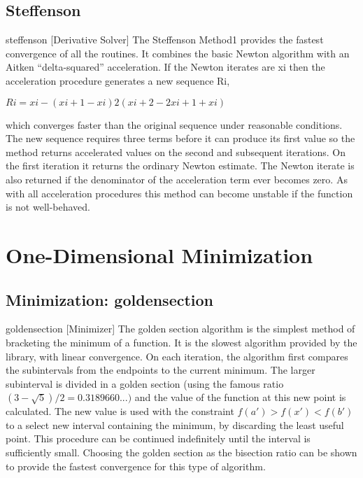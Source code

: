 \subsection{Steffenson}
steffenson [Derivative Solver]
The Steffenson Method1 provides the fastest convergence of all the routines. It combines
the basic Newton algorithm with an Aitken “delta-squared” acceleration. If the
Newton iterates are xi then the acceleration procedure generates a new sequence Ri,

$Ri = xi − (xi+1 − xi)2 (xi+2 − 2xi+1 + xi)$

which converges faster than the original sequence under reasonable conditions. The
new sequence requires three terms before it can produce its first value so the method
returns accelerated values on the second and subsequent iterations. On the first
iteration it returns the ordinary Newton estimate. The Newton iterate is also returned
if the denominator of the acceleration term ever becomes zero.
As with all acceleration procedures this method can become unstable if the function
is not well-behaved.



\section{One-Dimensional Minimization}



\subsection{Minimization: goldensection}
goldensection [Minimizer]
The golden section algorithm is the simplest method of bracketing the minimum of a
function. It is the slowest algorithm provided by the library, with linear convergence.
On each iteration, the algorithm first compares the subintervals from the endpoints to
the current minimum. The larger subinterval is divided in a golden section (using the
famous ratio $(3 − \sqrt{5})/2 = 0.3189660. . . )$ and the value of the function at this new
point is calculated. The new value is used with the constraint $f(a′) > f(x′) < f(b′)$
to a select new interval containing the minimum, by discarding the least useful point.
This procedure can be continued indefinitely until the interval is sufficiently small.
Choosing the golden section as the bisection ratio can be shown to provide the fastest
convergence for this type of algorithm.


